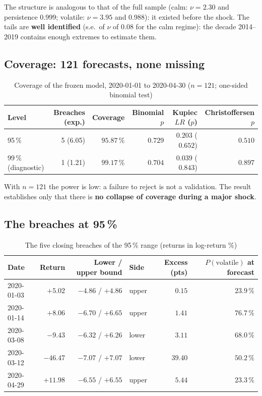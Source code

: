 \documentclass[12pt,a4paper]{article}
\begin{document}
The structure is analogous to that of the full sample (calm: $\nu=2.30$ and persistence $0.999$; volatile: $\nu=3.95$ and $0.988$): it existed before the shock. The tails are \textbf{well identified} (s.e.\ of $\nu$ of $0.08$ for the calm regime): the decade 2014--2019 contains enough extremes to estimate them.

\subsection{Coverage: 121 forecasts, none missing}

\begin{table}[H]
	\centering
	\small
	\caption{Coverage of the frozen model, 2020-01-01 to 2020-04-30 ($n=121$; one-sided binomial test)}
	\label{tab:shock-coverage}
	\setlength{\tabcolsep}{4pt}
	\begin{tabular}{lrrrrr}
		\toprule
		Level & Breaches (exp.) & Coverage & Binomial $p$ & Kupiec $LR$ ($p$) & Christoffersen $p$ \\
		\midrule
		95\,\% & 5 (6.05) & $95.87\,\%$ & $0.729$ & $0.203$ ($0.652$) & $0.510$ \\
		99\,\% (diagnostic) & 1 (1.21) & $99.17\,\%$ & $0.704$ & $0.039$ ($0.843$) & $0.897$ \\
		\bottomrule
	\end{tabular}
\end{table}

With $n=121$ the power is low: a failure to reject is not a validation. The result establishes only that there is \textbf{no collapse of coverage during a major shock}.

\subsection{The breaches at 95\,\%}

\begin{table}[H]
	\centering
	\small
	\caption{The five closing breaches of the 95\,\% range (returns in log-return \%)}
	\label{tab:shock-breaches}
	\begin{tabular}{lrrlrr}
		\toprule
		Date & Return & Lower / upper bound & Side & Excess (pts) & $P(\text{volatile})$ at forecast \\
		\midrule
		2020-01-03 & $+5.02$ & $-4.86$ / $+4.86$ & upper & $0.15$ & $23.9\,\%$ \\
		2020-01-14 & $+8.06$ & $-6.70$ / $+6.65$ & upper & $1.41$ & $76.7\,\%$ \\
		2020-03-08 & $-9.43$ & $-6.32$ / $+6.26$ & lower & $3.11$ & $68.0\,\%$ \\
		2020-03-12 & $\mathbf{-46.47}$ & $-7.07$ / $+7.07$ & lower & $\mathbf{39.40}$ & $50.2\,\%$ \\
		2020-04-29 & $+11.98$ & $-6.55$ / $+6.55$ & upper & $5.44$ & $23.3\,\%$ \\
		\bottomrule
	\end{tabular}
\end{table}
\end{document}
